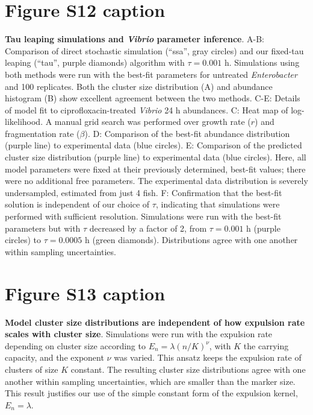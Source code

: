 \section*{Figure S12 caption}
\textbf{Tau leaping simulations and \textit{Vibrio} parameter inference}. A-B: Comparison of direct stochastic simulation (``ssa'', gray circles) and our fixed-tau leaping (``tau'', purple diamonds) algorithm with $\tau = 0.001$ h. Simulations using both methods were run with the best-fit parameters for untreated \textit{Enterobacter} and 100 replicates. Both the cluster size distribution (A) and abundance histogram (B) show excellent agreement between the two methods. C-E: Details of model fit to ciprofloxacin-treated \textit{Vibrio} 24 h abundances. C: Heat map of log-likelihood. A manual grid search was performed over growth rate ($r$) and fragmentation rate ($\beta$). D: Comparison of the best-fit abundance distribution (purple line) to experimental data (blue circles). E: Comparison of the predicted cluster size distribution (purple line) to experimental data (blue circles). Here, all model parameters were fixed at their previously determined, best-fit values; there were no additional free parameters. The experimental data distribution is severely undersampled, estimated from just 4 fish. F: Confirmation that the best-fit solution is independent of our choice of $\tau$, indicating that simulations were performed with sufficient resolution. Simulations were run with the best-fit parameters but with $\tau$ decreased by a factor of 2, from $\tau=0.001$ h (purple circles) to $\tau = 0.0005$ h (green diamonds). Distributions agree with one another within sampling uncertainties.

\section*{Figure S13 caption}
\textbf{Model cluster size distributions are independent of how expulsion rate scales with cluster size}. Simulations were run with the expulsion rate depending on cluster size according to $E_n = \lambda (n/K)^{\nu}$, with $K$ the carrying capacity, and the exponent $\nu$ was varied. This ansatz keeps the expulsion rate of clusters of size $K$ constant. The resulting cluster size distributions agree with one another within sampling uncertainties, which are smaller than the marker size. This result justifies our use of the simple constant form of the expulsion kernel, $E_n = \lambda$.

\newpage
\renewcommand{\figurename}{Supplementary Figure }


